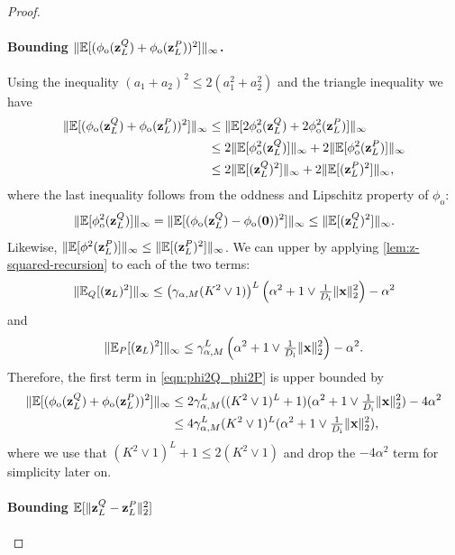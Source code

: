 \documentclass[twoside]{article}
\renewcommand{\ss}[1]{_{\text{#1}}}
\newcommand{\vx}{\mathbf{x}}
\newcommand{\vz}{\mathbf{z}}
\newcommand{\E}{\mathbb{E}}
\renewcommand{\P}{\mathbb{P}}
\newcommand{\Q}{\mathbb{Q}}
\renewcommand{\Q}{\ensuremath{Q}}
\renewcommand{\P}{\ensuremath{P}}
\renewcommand{\ss}[1]{_{\text{#1}}}        %
\DeclarePairedDelimiter\norm{\|}{\|}             %
\theoremstyle{theoremstyle}
\begin{document}
\begin{proof}
\paragraph{Bounding $\norm{\E[(\phi\ss{o}(\vz^Q_L) + \phi\ss{o}(\vz^P_L))^2]}_\infty$.} Using the inequality $(a_1+a_2)^2 \le 2(a_1^2 + a_2^2)$ and the triangle inequality we have
\begin{align}
    \norm{\E[(\phi\ss{o}(\vz^Q_L) + \phi\ss{o}(\vz^P_L))^2]}_\infty
    &\le \norm{\E[2\phi\ss{o}^2(\vz^Q_L) + 2\phi\ss{o}^2(\vz^P_L)]}_\infty \\
    &\le 2\norm{\E[\phi\ss{o}^2(\vz^Q_L)]}_\infty + 2\norm{\E[\phi\ss{o}^2(\vz^P_L)]}_\infty \\
    &\le 2\norm{\E[(\vz^Q_L)^2]}_\infty + 2\norm{\E[(\vz^P_L)^2]}_\infty,
\end{align}
where the last inequality follows from the oddness and Lipschitz property of $\phi\ss{o}$:
\begin{equation}
    \norm{\E[\phi\ss{o}^2(\vz^Q_L)]}_\infty = \norm{\E[(\phi\ss{o}(\vz^Q_L) - \phi\ss{o}(\mathbf{0}))^2]}_\infty
    \le \norm{\E[(\vz^Q_L)^2]}_\infty.
\end{equation}
Likewise, $\norm{\E[\phi^2(\vz^P_L)]}_\infty \le \norm{\E[(\vz^P_L)^2]}_\infty$. We can upper  by applying  \cref{lem:z-squared-recursion} to each of the two terms:
\begin{align}
    \norm{\E_{\Q}[(\vz_L)^2]}_\infty \leq \left(\gamma_{\alpha,M}(K^2 \lor 1)\right)^{L}\left(\alpha^2 + 1\lor \tfrac1{D\ss{i}}\|\vx\|^2_2\right) - \alpha^2
\end{align} 
and
\begin{align}
    \norm{\E_{\P}[(\vz_L)^2]}_\infty \leq \gamma_{\alpha,M}^{L}\left(\alpha^2 + 1\lor \tfrac1{D\ss{i}}\|\vx\|^2_2\right) -\alpha^2.
\end{align}
Therefore, the first term in \cref{eqn:phi2Q_phi2P} is upper bounded by
\begin{align}
    \norm{\E[(\phi\ss{o}(\vz^Q_L) + \phi\ss{o}(\vz^P_L))^2]}_\infty 
    &\le 2 \gamma_{\alpha,M}^L ((K^2 \lor 1)^L + 1 ) (\alpha^2 + 1\lor \tfrac1{D\ss{i}}\|\vx\|^2_2 ) - 4\alpha^2 \\
    &\le 4 \gamma_{\alpha,M}^L (K^2 \lor 1)^L (\alpha^2 + 1\lor \tfrac1{D\ss{i}}\|\vx\|^2_2 ), \label{eqn:diag-frob-norm-part1}
\end{align}
where we use that $(K^2 \lor 1)^L + 1 \le 2(K^2 \lor 1)$ and drop the $-4\alpha^2$ term for simplicity later on.

\paragraph{Bounding $\E[ \norm{\vz^Q_L - \vz^P_L}^2_2]$}


\end{proof}
\end{document}
